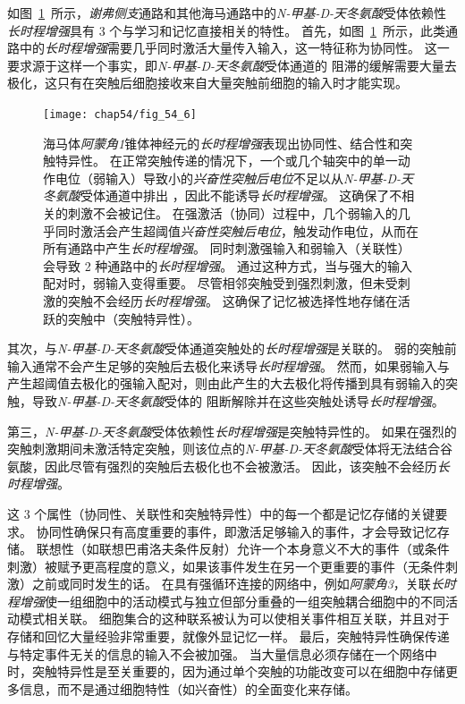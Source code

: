 如图~\ref{fig:54_6}~所示，\textit{谢弗侧支}通路和其他海马通路中的\textit{N-甲基-D-天冬氨酸}受体依赖性\textit{长时程增强}具有 3 个与学习和记忆直接相关的特性。
首先，如图~\ref{fig:54_6}~所示，此类通路中的\textit{长时程增强}需要几乎同时激活大量传入输入，这一特征称为协同性。
这一要求源于这样一个事实，即\textit{N-甲基-D-天冬氨酸}受体通道的  阻滞的缓解需要大量去极化，这只有在突触后细胞接收来自大量突触前细胞的输入时才能实现。


\begin{figure}[htbp]
	\centering
	\texttt{[image: chap54/fig\_54\_6]}
	\caption{海马体\textit{阿蒙角1}锥体神经元的\textit{长时程增强}表现出协同性、结合性和突触特异性。
		在正常突触传递的情况下，一个或几个轴突中的单一动作电位（弱输入）导致小的\textit{兴奋性突触后电位}不足以从\textit{N-甲基-D-天冬氨酸}受体通道中排出 ，因此不能诱导\textit{长时程增强}。
		这确保了不相关的刺激不会被记住。 
		在强激活（协同）过程中，几个弱输入的几乎同时激活会产生超阈值\textit{兴奋性突触后电位}，触发动作电位，从而在所有通路中产生\textit{长时程增强}。
		同时刺激强输入和弱输入（关联性）会导致 2 种通路中的\textit{长时程增强}。
		通过这种方式，当与强大的输入配对时，弱输入变得重要。
		尽管相邻突触受到强烈刺激，但未受刺激的突触不会经历\textit{长时程增强}。
		这确保了记忆被选择性地存储在活跃的突触中（突触特异性）。}
	\label{fig:54_6}
\end{figure}


其次，与\textit{N-甲基-D-天冬氨酸}受体通道突触处的\textit{长时程增强}是关联的。
弱的突触前输入通常不会产生足够的突触后去极化来诱导\textit{长时程增强}。
然而，如果弱输入与产生超阈值去极化的强输入配对，则由此产生的大去极化将传播到具有弱输入的突触，导致\textit{N-甲基-D-天冬氨酸}受体的  阻断解除并在这些突触处诱导\textit{长时程增强}。


第三，\textit{N-甲基-D-天冬氨酸}受体依赖性\textit{长时程增强}是突触特异性的。
如果在强烈的突触刺激期间未激活特定突触，则该位点的\textit{N-甲基-D-天冬氨酸}受体将无法结合谷氨酸，因此尽管有强烈的突触后去极化也不会被激活。
因此，该突触不会经历\textit{长时程增强}。


这 3 个属性（协同性、关联性和突触特异性）中的每一个都是记忆存储的关键要求。
协同性确保只有高度重要的事件，即激活足够输入的事件，才会导致记忆存储。
联想性（如联想巴甫洛夫条件反射）允许一个本身意义不大的事件（或条件刺激）被赋予更高程度的意义，如果该事件发生在另一个更重要的事件（无条件刺激）之前或同时发生的话。
在具有强循环连接的网络中，例如\textit{阿蒙角3}，关联\textit{长时程增强}使一组细胞中的活动模式与独立但部分重叠的一组突触耦合细胞中的不同活动模式相关联。
细胞集合的这种联系被认为可以使相关事件相互关联，并且对于存储和回忆大量经验非常重要，就像外显记忆一样。
最后，突触特异性确保传递与特定事件无关的信息的输入不会被加强。
当大量信息必须存储在一个网络中时，突触特异性是至关重要的，因为通过单个突触的功能改变可以在细胞中存储更多信息，而不是通过细胞特性（如兴奋性）的全面变化来存储。



